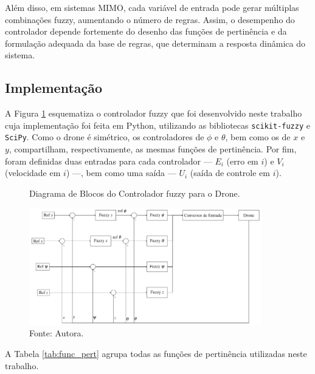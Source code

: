 Além disso, em sistemas MIMO, cada variável de entrada pode gerar 
múltiplas combinações fuzzy, aumentando o número de regras. Assim, o desempenho do controlador 
depende fortemente do desenho das funções de pertinência e da formulação adequada da base de 
regras, que determinam a resposta dinâmica do sistema.

\subsection{Implementação}
A Figura \ref{fig:pid_diagram} esquematiza o controlador fuzzy que foi desenvolvido neste trabalho cuja 
implementação foi feita em Python, utilizando as bibliotecas \texttt{scikit-fuzzy} e \texttt{SciPy}. 
Como o drone é simétrico, os controladores de $\phi$ e $\theta$, bem como os de $x$ e $y$, 
compartilham, respectivamente, as mesmas funções de pertinência. Por fim, foram definidas duas 
entradas para cada controlador — $E_i$ (erro em $i$) e $V_i$ (velocidade em $i$) —, bem como uma 
saída — $U_i$ (saída de controle em $i$).
\begin{figure}[h!]
    \centering
    \caption{Diagrama de Blocos do Controlador fuzzy para o Drone.}
    \includegraphics[width=0.9\textwidth]{figs/fuzzy_drone.png}
    \caption*{\footnotesize{Fonte: Autora.}}
    \label{fig:pid_diagram}
\end{figure}

\pagebreak

A Tabela \ref{tab:func_pert} agrupa todas as funções de pertinência 
utilizadas neste trabalho.


